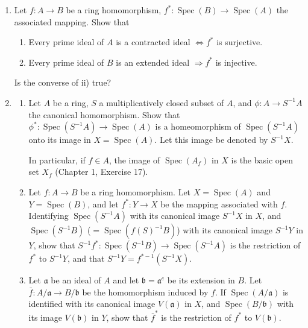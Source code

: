 \begin{enumerate}
\item Let $f:A\longrightarrow B$ be a ring homomorphism, $f^*:\operatorname{Spec}(B)\longrightarrow\operatorname{Spec}(A)$ the associated mapping. Show that
\begin{enumerate}
\renewcommand{\labelenumii}{\roman{enumii})}
\item Every prime ideal of $A$ is a contracted ideal $\Longleftrightarrow f^*$ is surjective.
\item Every prime ideal of $B$ is an extended ideal $\Rightarrow f^*$ is injective.
\end{enumerate}
Is the converse of ii) true?

\item
\begin{enumerate}
\renewcommand{\labelenumii}{\roman{enumii})}
\item Let $A$ be a ring, $S$ a multiplicatively closed subset of $A$, and $\phi:A\longrightarrow S^{-1}A$ the canonical homomorphism. Show that $\phi^*:\operatorname{Spec}(S^{-1}A)\longrightarrow\operatorname{Spec}(A)$ is a homeomorphism of $\operatorname{Spec}(S^{-1}A)$ onto its image in $X=\operatorname{Spec}(A)$. Let this image be denoted by $S^{-1}X$.

In particular, if $f\in A$, the image of $\operatorname{Spec}(A_f)$ in $X$ is the basic open set $X_f$ (Chapter 1, Exercise 17).

\item Let $f:A\longrightarrow B$ be a ring homomorphism. Let $X=\operatorname{Spec}(A)$ and $Y=\operatorname{Spec}(B)$, and let $f^*:Y\longrightarrow X$ be the mapping associated with $f$. Identifying $\operatorname{Spec}(S^{-1}A)$ with its canonical image $S^{-1}X$ in $X$, and $\operatorname{Spec}(S^{-1}B)$ ($=\operatorname{Spec}(f(S)^{-1}B)$) with its canonical image $S^{-1}Y$ in $Y$, show that $S^{-1}f^*:\operatorname{Spec}(S^{-1}B)\longrightarrow\operatorname{Spec}(S^{-1}A)$ is the restriction of $f^*$ to $S^{-1}Y$, and that $S^{-1}Y=f^{*-1}(S^{-1}X)$.

\item Let $\mathfrak a$ be an ideal of $A$ and let $\mathfrak b=\mathfrak a^e$ be its extension in $B$. Let $\bar f:A/\mathfrak a\longrightarrow B/\mathfrak b$ be the homomorphism induced by $f$. If $\operatorname{Spec}(A/\mathfrak a)$ is identified with its canonical image $V(\mathfrak a)$ in $X$, and $\operatorname{Spec}(B/\mathfrak b)$ with its image $V(\mathfrak b)$ in $Y$, show that $\bar f^*$ is the restriction of $f^*$ to $V(\mathfrak b)$.


\end{enumerate}
\end{enumerate}
